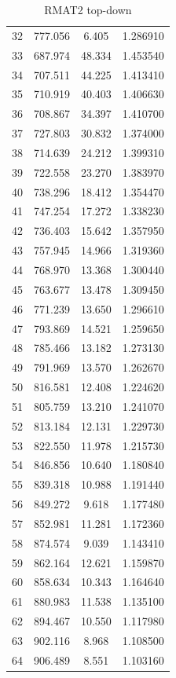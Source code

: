 \documentclass[10pt,twocolumn,letterpaper]{article}
\begin{document}
\begin{table}[h]
\begin{tabular}{@{}c|ccc@{}}
32 & 777.056 & 6.405 & 1.286910 \\
33 & 687.974 & 48.334 & 1.453540 \\
34 & 707.511 & 44.225 & 1.413410 \\
35 & 710.919 & 40.403 & 1.406630 \\
36 & 708.867 & 34.397 & 1.410700 \\
37 & 727.803 & 30.832 & 1.374000 \\
38 & 714.639 & 24.212 & 1.399310 \\
39 & 722.558 & 23.270 & 1.383970 \\
40 & 738.296 & 18.412 & 1.354470 \\
41 & 747.254 & 17.272 & 1.338230 \\
42 & 736.403 & 15.642 & 1.357950 \\
43 & 757.945 & 14.966 & 1.319360 \\
44 & 768.970 & 13.368 & 1.300440 \\
45 & 763.677 & 13.478 & 1.309450 \\
46 & 771.239 & 13.650 & 1.296610 \\
47 & 793.869 & 14.521 & 1.259650 \\
48 & 785.466 & 13.182 & 1.273130 \\
49 & 791.969 & 13.570 & 1.262670 \\
50 & 816.581 & 12.408 & 1.224620 \\
51 & 805.759 & 13.210 & 1.241070 \\
52 & 813.184 & 12.131 & 1.229730 \\
53 & 822.550 & 11.978 & 1.215730 \\
54 & 846.856 & 10.640 & 1.180840 \\
55 & 839.318 & 10.988 & 1.191440 \\
56 & 849.272 & 9.618 & 1.177480 \\
57 & 852.981 & 11.281 & 1.172360 \\
58 & 874.574 & 9.039 & 1.143410 \\
59 & 862.164 & 12.621 & 1.159870 \\
60 & 858.634 & 10.343 & 1.164640 \\
61 & 880.983 & 11.538 & 1.135100 \\
62 & 894.467 & 10.550 & 1.117980 \\
63 & 902.116 & 8.968 & 1.108500 \\
64 & 906.489 & 8.551 & 1.103160 \\
\bottomrule
\end{tabular}
\caption{RMAT2 top-down}
\end{table}
\end{document}
